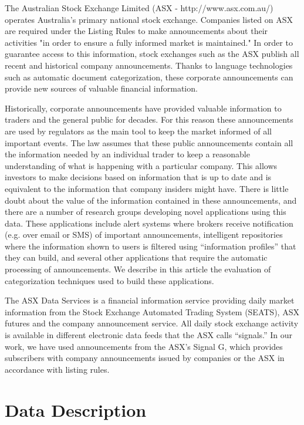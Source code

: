 \documentclass[twocolumn]{article}
\begin{document}
The Australian Stock Exchange Limited (ASX - http://www.asx.com.au/)
operates Australia's primary national stock exchange.  Companies
listed on ASX are required under the Listing Rules to make
announcements about their activities "in order to ensure a fully
informed market is maintained." \cite{asx:02} In order to guarantee
access to this information, stock exchanges such as the ASX publish
all recent and historical company announcements.  Thanks to language
technologies such as automatic document categorization, these
corporate announcements can provide new sources of valuable financial
information.

Historically, corporate announcements have provided valuable
information to traders and the general public for decades. For this
reason these announcements are used by regulators as the main tool to
keep the market informed of all important events. The law assumes that
these public announcements contain all the information needed by an
individual trader to keep a reasonable understanding of what is
happening with a particular company. This allows investors to make
decisions based on information that is up to date and is equivalent to
the information that company insiders might have. There is little
doubt about the value of the information contained in these
announcements, and there are a number of research groups developing
novel applications using this data. These applications include alert
systems where brokers receive notification (e.g. over email or SMS) of
important announcements, intelligent repositories where the
information shown to users is filtered using ``information profiles''
that they can build, and several other applications that require the
automatic processing of announcements.  We describe in this article
the evaluation of categorization techniques used to build these
applications.

The ASX Data Services is a financial information service providing
daily market information from the Stock Exchange Automated Trading
System (SEATS), ASX futures and the company announcement service.  All
daily stock exchange activity is available in different electronic
data feeds that the ASX calls ``signals.''  In our work, we have used
announcements from the ASX's Signal G, which provides subscribers with
company announcements issued by companies or the ASX in accordance
with listing rules.

\section{Data Description}
\label{data}
\end{document}
